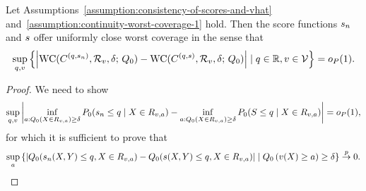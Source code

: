 \begin{lemma}
  \label{lem:uniform-convergence-over-v-for-scores}
  Let Assumptions~\ref{assumption:consistency-of-scores-and-vhat}
  and~\ref{assumption:continuity-worst-coverage-1} hold. Then the score
  functions $s_n$ and $s$ offer uniformly close worst coverage in
  the sense that
  \begin{equation*}
    \sup_{q,v}
    \left\{ \left| \wc( C^{(q, \scoreest)}, \mc{R}_{ v}, \delta; \,  Q_{0})
    -\wc( {C}^{(q,  \score)}, \mc{R}_{v}, \delta; \, Q_0) \right|
    \mid q \in \R, v \in \mc{V} \right\}
    = o_P(1). %
  \end{equation*}
\end{lemma}
\begin{proof}
  We need to show
  \begin{align*}
    \sup_{q,v} \left| \inf_{a : Q_{0}(X \in R_{ v,a}) \geq \delta}P_{0}( s_n \leq q \mid X \in R_{ v,a})- \inf_{a : Q_{0}(X \in R_{ v,a}) \geq \delta}P_{0}({S} \leq  q \mid X \in R_{ v,a})
    \right| = o_P(1),
  \end{align*}
  for which it is sufficient to prove that
  \begin{align*}
    \label{eqn:intersect-prob-close-v-2}
    \sup_a \left\{ \lvert Q_{0}(s_n(X,Y) \leq q, X \in R_{{v},a})
    -Q_0( s(X,Y) \leq q  ,X \in R_{{v},a})\rvert   
    \mid Q_0\left( v(X) \ge a\right) \ge \delta  \right\}
    \stackrel{p}{\rightarrow} 0.
  \end{align*}


\end{proof}
